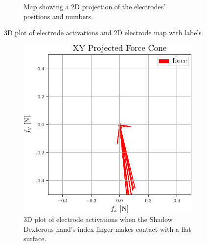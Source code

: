 \begin{figure}[h]
\begin{subfigure}[b]{0.48\textwidth}
		\caption{Map showing a 2D projection of the electrodes' positions and numbers.}
		\label{fig:electrode-map3}
	\end{subfigure}
		\caption{3D plot of electrode activations and 2D electrode map with labels.}
		\label{fig:flat-contact-experimental-and-electrode-map3}
\end{figure}


\begin{figure}[h]
	\centering
	\begin{subfigure}[b]{0.48\textwidth}
		\centering
		\includegraphics[width=\textwidth]{chapters/1-tactile-perception/fig/matplotlib/xy-projected-force-cones.pdf}
		\caption{3D plot of electrode activations when the Shadow Dexterous hand's index finger makes contact with a flat surface.}
		\label{fig:simulated-electrode-distribution2}
	\end{subfigure}
	\hfill
	\begin{subfigure}[b]{0.48\textwidth}
		\centering

\end{subfigure}
\end{figure}
